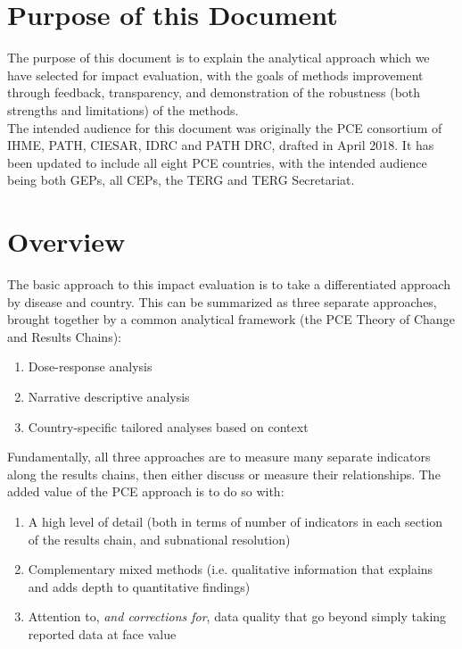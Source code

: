 \documentclass[twocolumn]{bmcart}%
\begin{document}

\section{Purpose of this Document}
The purpose of this document is to explain the analytical approach which we have selected for impact evaluation, with the goals of methods improvement through feedback, transparency, and demonstration of the robustness (both strengths and limitations) of the methods.\\

The intended audience for this document was originally the PCE consortium of IHME, PATH, CIESAR, IDRC and PATH DRC, drafted in April 2018. It has been updated to include all eight PCE countries, with the intended audience being both GEPs, all CEPs, the TERG and TERG Secretariat.

\section{Overview}
The basic approach to this impact evaluation is to take a differentiated approach by disease and country. This can be summarized as three separate approaches, brought together by a common analytical framework (the PCE Theory of Change and Results Chains):

\begin{enumerate}
  \item Dose-response analysis
  \item Narrative descriptive analysis
  \item Country-specific tailored analyses based on context
\end{enumerate}
\smallskip

Fundamentally, all three approaches are to measure many separate indicators along the results chains, then either discuss or measure their relationships. The added value of the PCE approach is to do so with:
\begin{enumerate}
  \item A high level of detail (both in terms of number of indicators in each section of the results chain, and subnational resolution)
  \item Complementary mixed methods (i.e. qualitative information that explains and adds depth to quantitative findings)
  \item Attention to, \textit{and corrections for}, data quality that go beyond simply taking reported data at face value
\end{enumerate}
\smallskip
\end{document}
